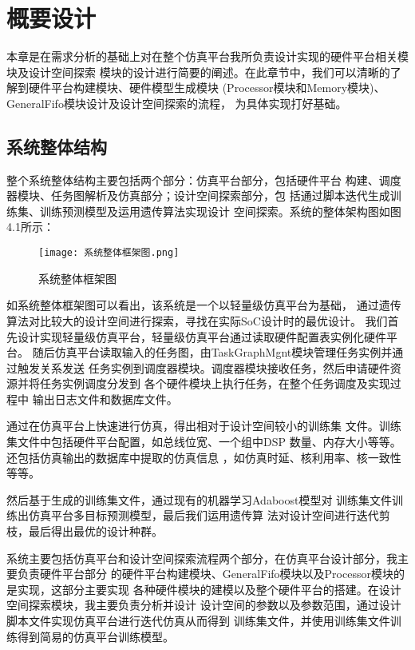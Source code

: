 
\chapter{概要设计}
本章是在需求分析的基础上对在整个仿真平台我所负责设计实现的硬件平台相关模块及设计空间探索
模块的设计进行简要的阐述。在此章节中，我们可以清晰的了解到硬件平台构建模块、硬件模型生成模块
(Processor模块和Memory模块)、GeneralFifo模块设计及设计空间探索的流程，
为具体实现打好基础。

\section{系统整体结构}
整个系统整体结构主要包括两个部分：仿真平台部分，包括硬件平台
构建、调度器模块、任务图解析及仿真部分；设计空间探索部分，包
括通过脚本迭代生成训练集、训练预测模型及运用遗传算法实现设计
空间探索。系统的整体架构图如图4.1所示：

\begin{figure}[h]
    \centering
    \texttt{[image: 系统整体框架图.png]}
    \caption{系统整体框架图}
    \label{fig:badge}
\end{figure}

如系统整体框架图可以看出，该系统是一个以轻量级仿真平台为基础，
通过遗传算法对比较大的设计空间进行探索，寻找在实际SoC设计时的最优设计。
我们首先设计实现轻量级仿真平台，轻量级仿真平台通过读取硬件配置表实例化硬件平台。
随后仿真平台读取输入的任务图，由TaskGraphMgnt模块管理任务实例并通过触发关系发送
任务实例到调度器模块。调度器模块接收任务，然后申请硬件资源并将任务实例调度分发到
各个硬件模块上执行任务，在整个任务调度及实现过程中 输出日志文件和数据库文件。

通过在仿真平台上快速进行仿真，得出相对于设计空间较小的训练集
文件。训练集文件中包括硬件平台配置，如总线位宽、一个组中DSP
数量、内存大小等等。还包括仿真输出的数据库中提取的仿真信息
，如仿真时延、核利用率、核一致性等等。

然后基于生成的训练集文件，通过现有的机器学习Adaboost模型\cite{29}对
训练集文件训练出仿真平台多目标预测模型\cite{30}，最后我们运用遗传算
法对设计空间进行迭代剪枝，最后得出最优的设计种群。

系统主要包括仿真平台和设计空间探索流程两个部分，在仿真平台设计部分，我主要负责硬件平台部分
的硬件平台构建模块、GeneralFifo模块以及Processor模块的是实现，这部分主要实现
各种硬件模块的建模以及整个硬件平台的搭建。在设计空间探索模块，我主要负责分析并设计
设计空间的参数以及参数范围，通过设计脚本文件实现仿真平台进行迭代仿真从而得到
训练集文件，并使用训练集文件训练得到简易的仿真平台训练模型。


